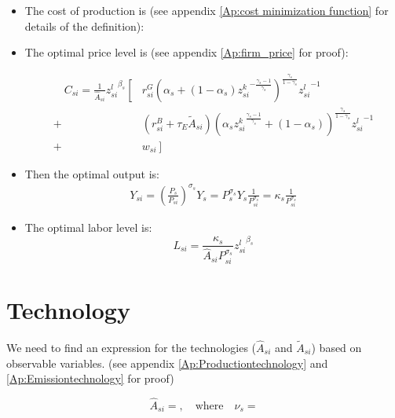 \documentclass[12pt]{article} %
\begin{document}
\begin{itemize}
    \item The cost of production is (see appendix \ref{Ap:cost minimization function} for details of the definition):
    
 
    \item The optimal price level is (see appendix \ref{Ap:firm_price} for proof):
    
    \begin{equation*}
         \begin{split}
            \quad C_{si}  =  \frac{1}{\hat{A}_{si}} {z_{si}^l}^{\beta_s}  \left[\right. &
         r^{G}_{si}( \alpha_s  + (1-\alpha_s){z^k_{si}}^{-\frac{\gamma_s-1}{\gamma_s}})
			^{\frac{\gamma_s}{1-\gamma_s}} {z_{si}^l}^{-1} \\
            + & (r^{B}_{si} + \tau_{E}\tilde{A}_{si})(
				\alpha_s {z^k_{si}}^{\frac{\gamma_s -1}{\gamma_s}} + (1-\alpha_s)
			)^{\frac{\gamma_s}{1-\gamma_s}} {z_{si}^l}^{-1}\\
            + & w_{si} \left.\right]
         \end{split}
	\end{equation*}
    \item Then the optimal output is:
    \begin{equation}
        \begin{split}
            Y_{si} = \left(\frac{P_s}{P_{si}}\right)^{\sigma_s}{Y}_s = P_s^{\sigma_s} {Y}_s \frac{1}{P_{si} ^{\sigma_s}}  = \kappa_s \frac{1}{P_{si} ^{\sigma_s}}
        \end{split}
    \end{equation}
    \item The optimal labor level is:
    \begin{equation}
        L_{si} = \frac{\kappa_s}{\hat{A}_{si}P_{si} ^{\sigma_s}}  {z_{si}^l}^{\beta_s}
    \end{equation}
\end{itemize}

\section*{Technology}
We need to find an expression for the technologies ($\hat{A}_{si}$ and $\tilde{A}_{si}$) based on observable variables. (see appendix \ref{Ap:Productiontechnology} and \ref{Ap:Emissiontechnology} for proof)

\begin{equation*}
    \hat{A}_{si} = , \quad \text{where} \quad \nu_s = 
\end{equation*}
\end{document}
